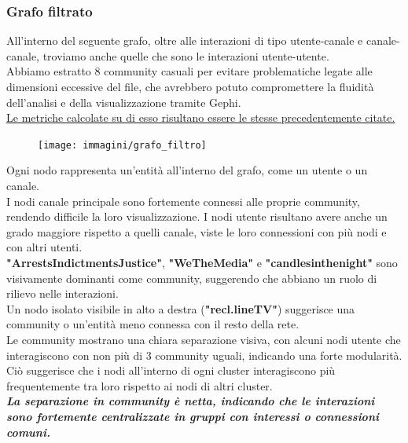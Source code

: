\documentclass[12pt]{article}
\begin{document}
	\subsubsection{Grafo filtrato}
	All'interno del seguente grafo, oltre alle interazioni di tipo utente-canale e canale-canale, troviamo anche quelle che sono le interazioni utente-utente.\\
	Abbiamo estratto 8 community casuali  per evitare problematiche legate alle dimensioni eccessive del file, che avrebbero potuto compromettere la fluidità dell'analisi e della visualizzazione tramite Gephi.\\
\underline{Le metriche calcolate su di esso risultano essere le stesse precedentemente citate.}
\begin{figure}[H]
	\centering
	\texttt{[image: immagini/grafo\_filtro]}
\end{figure}
Ogni nodo rappresenta un'entità all'interno del grafo, come un utente o un canale.\\
I nodi canale principale sono fortemente connessi alle proprie community, rendendo difficile la loro visualizzazione. I nodi utente risultano avere anche un grado maggiore rispetto a quelli canale, viste le loro connessioni con più nodi e con altri utenti. \\ \textbf{"ArrestsIndictmentsJustice"}, \textbf{"WeTheMedia"} e \textbf{"candlesinthenight"} sono visivamente dominanti come community, suggerendo che abbiano un ruolo di rilievo nelle interazioni.\\
Un nodo isolato visibile in alto a destra (\textbf{"recl.lineTV"}) suggerisce una community o un'entità meno connessa con il resto della rete.\\
Le community mostrano una chiara separazione visiva, con alcuni nodi utente che interagiscono con non più di 3 community uguali, indicando una forte modularità. Ciò suggerisce che i nodi all'interno di ogni cluster interagiscono più frequentemente tra loro rispetto ai nodi di altri cluster.\\
\textbf{\textit{La separazione in community è netta, indicando che le interazioni sono fortemente centralizzate in gruppi con interessi o connessioni comuni.}}
\end{document}

